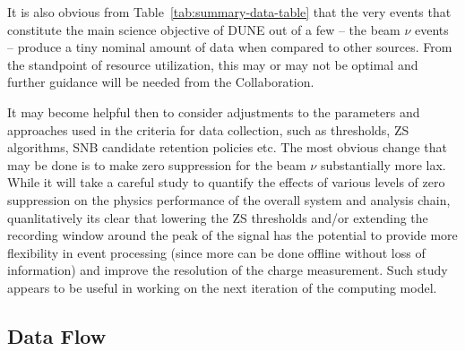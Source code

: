 \noindent
It is also obvious from Table~\ref{tab:summary-data-table} that the very events that constitute the main science objective of DUNE
out of a few -- the beam $\nu$ events -- produce a tiny nominal amount of data when compared to other sources. From the standpoint
of resource utilization, this may or may not be optimal and further guidance will be needed from the Collaboration.

It may become helpful then to consider adjustments to the parameters and approaches used in the criteria for data collection, such as
thresholds, ZS algorithms, SNB candidate retention policies etc. The most obvious change that may be done is to make zero suppression
for the beam $\nu$ substantially more lax. While it will take a careful study to quantify the effects of various levels of zero suppression
on the physics performance of the overall system and analysis chain, quanlitatively its clear that lowering the ZS thresholds and/or
extending the recording window around the peak of the signal has the potential to provide more flexibility in event processing (since
more can be done offline without loss of information) and improve the resolution of the charge measurement. Such study appears to
be useful in working on the next iteration of the computing model.


\subsection{Data Flow}
